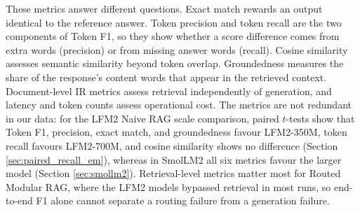 \documentclass[10pt]{article}
\begin{document}
These metrics answer different questions. Exact match rewards an output identical to the reference answer. Token precision and token recall are the two components of Token F1, so they show whether a score difference comes from extra words (precision) or from missing answer words (recall). Cosine similarity assesses semantic similarity beyond token overlap. Groundedness measures the share of the response's content words that appear in the retrieved context. Document-level IR metrics assess retrieval independently of generation, and latency and token counts assess operational cost. The metrics are not redundant in our data: for the LFM2 Naive RAG scale comparison, paired $t$-tests show that Token F1, precision, exact match, and groundedness favour LFM2-350M, token recall favours LFM2-700M, and cosine similarity shows no difference (Section \ref{sec:paired_recall_em}), whereas in SmolLM2 all six metrics favour the larger model (Section \ref{sec:smollm2}). Retrieval-level metrics matter most for Routed Modular RAG, where the LFM2 models bypassed retrieval in most runs, so end-to-end F1 alone cannot separate a routing failure from a generation failure.
\end{document}
